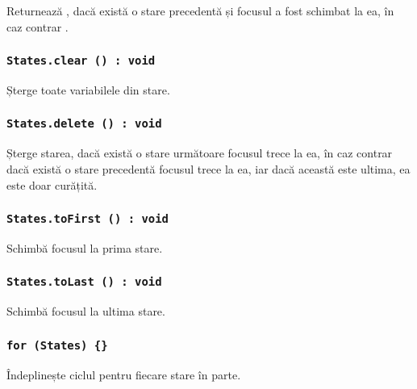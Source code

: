 Returnează \true, dacă există o stare precedentă și focusul a fost schimbat la ea, în caz contrar \false.

\subsubsection{\texttt{States.clear () : void}}

Șterge toate variabilele din stare.

\subsubsection{\texttt{States.delete () : void}}

Șterge starea, dacă există o stare următoare focusul trece la ea, în caz contrar dacă există o stare precedentă focusul trece la ea, iar dacă această este ultima, ea este doar curățită.

\subsubsection{\texttt{States.toFirst () : void}}

Schimbă focusul la prima stare.

\subsubsection{\texttt{States.toLast () : void}}

Schimbă focusul la ultima stare.

\subsubsection{\texttt{for (States) \{\}}}

Îndeplinește ciclul pentru fiecare stare în parte.

